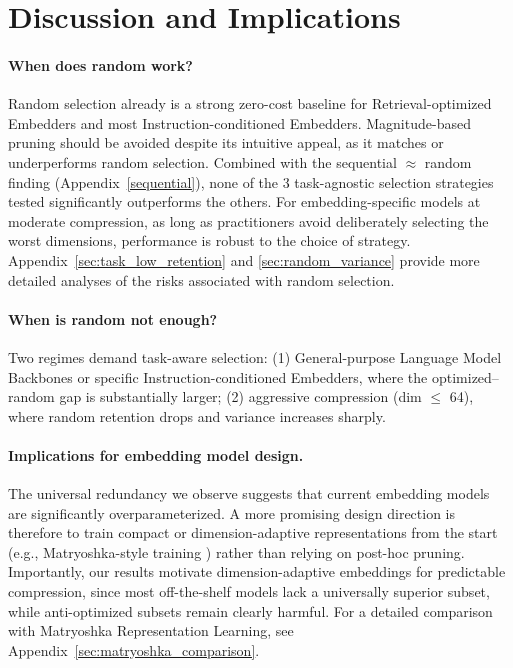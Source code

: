 \documentclass[11pt,a4paper]{article}
\begin{document}
\section{Discussion and Implications}

\paragraph{When does random work?}
Random selection already is a strong zero-cost baseline for Retrieval-optimized Embedders and most Instruction-conditioned Embedders. Magnitude-based pruning should be avoided despite its intuitive appeal, as it matches or underperforms random selection. Combined with the sequential $\approx$ random finding (Appendix~\ref{sequential}), none of the 3 task-agnostic selection strategies tested significantly outperforms the others. For embedding-specific models at moderate compression, as long as practitioners avoid deliberately selecting the worst dimensions, performance is robust to the choice of strategy. Appendix~\ref{sec:task_low_retention} and \ref{sec:random_variance} provide more detailed analyses of the risks associated with random selection.

\paragraph{When is random not enough?}
Two regimes demand task-aware selection: (1) General-purpose Language Model Backbones or specific Instruction-conditioned Embedders, where the optimized--random gap is substantially larger; (2) aggressive compression (dim $\leq$ 64), where random retention drops and variance increases sharply.
 
\paragraph{Implications for embedding model design.}
The universal redundancy we observe suggests that current embedding models are significantly overparameterized. A more promising design direction is therefore to train compact or dimension-adaptive representations from the start (e.g., Matryoshka-style training \citep{matryoshka2023}) rather than relying on post-hoc pruning. Importantly, our results motivate dimension-adaptive embeddings for predictable compression, since most off-the-shelf models lack a universally superior subset, while anti-optimized subsets remain clearly harmful. For a detailed comparison with Matryoshka Representation Learning, see Appendix~\ref{sec:matryoshka_comparison}.
\end{document}
